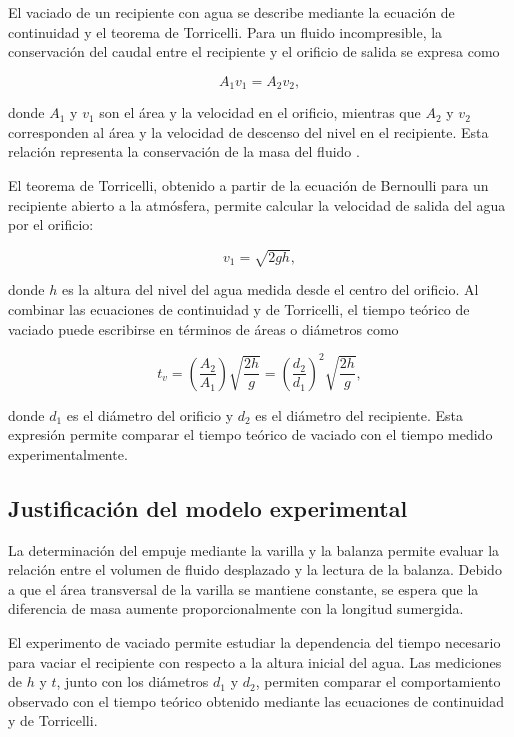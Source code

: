 El vaciado de un recipiente con agua se describe mediante la ecuación de continuidad y el teorema de Torricelli. Para un fluido incompresible, la conservación del caudal entre el recipiente y el orificio de salida se expresa como

\begin{equation}
    A_1v_1=A_2v_2,
    \label{eq:continuidad}
\end{equation}

donde $A_1$ y $v_1$ son el área y la velocidad en el orificio, mientras que $A_2$ y $v_2$ corresponden al área y la velocidad de descenso del nivel en el recipiente. Esta relación representa la conservación de la masa del fluido \cite{young2018}.

El teorema de Torricelli, obtenido a partir de la ecuación de Bernoulli para un recipiente abierto a la atmósfera, permite calcular la velocidad de salida del agua por el orificio:

\begin{equation}
    v_1=\sqrt{2gh},
    \label{eq:torricelli}
\end{equation}

donde $h$ es la altura del nivel del agua medida desde el centro del orificio. Al combinar las ecuaciones de continuidad y de Torricelli, el tiempo teórico de vaciado puede escribirse en términos de áreas o diámetros como

\begin{equation}
    t_v=\left(\frac{A_2}{A_1}\right)\sqrt{\frac{2h}{g}}
    =\left(\frac{d_2}{d_1}\right)^2\sqrt{\frac{2h}{g}},
    \label{eq:tiempo_vaciado}
\end{equation}

donde $d_1$ es el diámetro del orificio y $d_2$ es el diámetro del recipiente. Esta expresión permite comparar el tiempo teórico de vaciado con el tiempo medido experimentalmente.

\subsection{Justificación del modelo experimental}

La determinación del empuje mediante la varilla y la balanza permite evaluar la relación entre el volumen de fluido desplazado y la lectura de la balanza. Debido a que el área transversal de la varilla se mantiene constante, se espera que la diferencia de masa aumente proporcionalmente con la longitud sumergida.

El experimento de vaciado permite estudiar la dependencia del tiempo necesario para vaciar el recipiente con respecto a la altura inicial del agua. Las mediciones de $h$ y $t$, junto con los diámetros $d_1$ y $d_2$, permiten comparar el comportamiento observado con el tiempo teórico obtenido mediante las ecuaciones de continuidad y de Torricelli.
